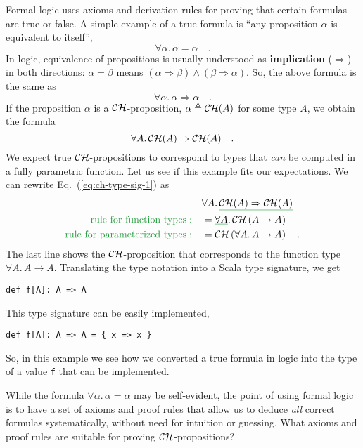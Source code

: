 Formal logic uses axioms and derivation rules for proving that certain
formulas are true or false. A simple example of a true formula is
\textsf{``}any proposition $\alpha$ is equivalent to itself\textsf{''},
\[
\forall\alpha.\,\alpha=\alpha\quad.
\]
In logic, equivalence of propositions is usually understood
as \textbf{implication} ($\Rightarrow$)
in both directions: $\alpha=\beta$ means $\left(\alpha\Rightarrow\beta\right)\wedge\left(\beta\Rightarrow\alpha\right)$.
So, the above formula is the same as
\[
\forall\alpha.\,\alpha\Rightarrow\alpha\quad.
\]
If the proposition $\alpha$ is a ${\cal CH}$-proposition, $\alpha\triangleq{\cal CH}(A)$
for some type $A$, we obtain the formula
\begin{equation}
\forall A.\,{\cal CH}(A)\Rightarrow{\cal CH}(A)\quad.\label{eq:ch-type-sig-1}
\end{equation}
We expect true ${\cal CH}$-propositions to correspond to types that
\emph{can} be computed in a fully parametric function. Let us see
if this example fits our expectations. We can rewrite Eq.~(\ref{eq:ch-type-sig-1})
as
\begin{align*}
 & \forall A.\,\gunderline{{\cal CH}(A)\Rightarrow{\cal CH}(A)}\\
{\color{greenunder}\text{rule for function types}:}\quad & =\gunderline{\forall A}.\,{\cal CH}\left(A\rightarrow A\right)\\
{\color{greenunder}\text{rule for parameterized types}:}\quad & ={\cal CH}\left(\forall A.\,A\rightarrow A\right)\quad.
\end{align*}
The last line shows the ${\cal CH}$-proposition that corresponds
to the function type $\forall A.\,A\rightarrow A$. Translating the
type notation into a Scala type signature, we get
\begin{lstlisting}
def f[A]: A => A
\end{lstlisting}
This type signature can be easily implemented,
\begin{lstlisting}
def f[A]: A => A = { x => x }
\end{lstlisting}
So, in this example we see how we converted a true formula in logic
into the type of a value \lstinline!f! that can be implemented.

While the formula $\forall\alpha.\,\alpha=\alpha$ may be self-evident,
the point of using formal logic is to have a set of axioms and proof
rules that allow us to deduce \emph{all} correct formulas systematically,
without need for intuition or guessing. What axioms and proof rules
are suitable for proving ${\cal CH}$-propositions?

